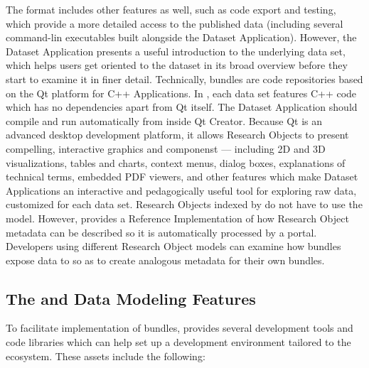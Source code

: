 \documentclass[10pt,letterpaper]{article}
\begin{document}
\p{}
The {\RAK} format includes other 
features as well, such as code export and testing, 
which provide a more detailed access to 
the published data (including several command-lin 
executables built alongside the Dataset Application).  
However, the Dataset Application 
presents a useful introduction to the underlying 
data set, which helps users get oriented to the dataset 
in its broad overview before they start to examine it in 
finer detail.
\p{}
Technically, {\MOSAIC} {\RAK} bundles are code repositories 
based on the Qt platform for C++ Applications.  
In {\RAK}, each data set features C++ code which has no 
dependencies apart from Qt itself.  The Dataset 
Application should compile and run automatically from 
inside Qt Creator.  Because Qt is an advanced 
desktop {\GUI} development platform, it allows 
Research Objects to present compelling, 
interactive graphics and {\GUI} componenst 
--- including 2D and 3D visualizations, tables and charts, 
context menus, dialog boxes, explanations of 
technical terms, embedded PDF viewers, and other 
features which make Dataset Applications an 
interactive and pedagogically useful tool for 
exploring raw data, customized for each data set.
\p{}  
Research Objects indexed by {\MOSAIC} do not have to 
use the {\RAK} model.  However, {\RAK} provides a 
Reference Implementation of how Research Object 
metadata can be described so it is automatically 
processed by a {\MOSAIC} portal.  Developers 
using different Research Object models can 
examine how {\RAK} bundles expose data to {\MOSAIC} 
so as to create analogous metadata for their own 
bundles.
\p{}
\subsection{The {\lMOSAIC} {\SDK} and Data Modeling Features}
To facilitate implementation of {\RAK} bundles, 
{\MOSAIC} provides several development tools and 
code libraries which can help set up a development 
environment tailored to the {\MOSAIC} ecosystem.  
These assets include the following: 
\end{document}
